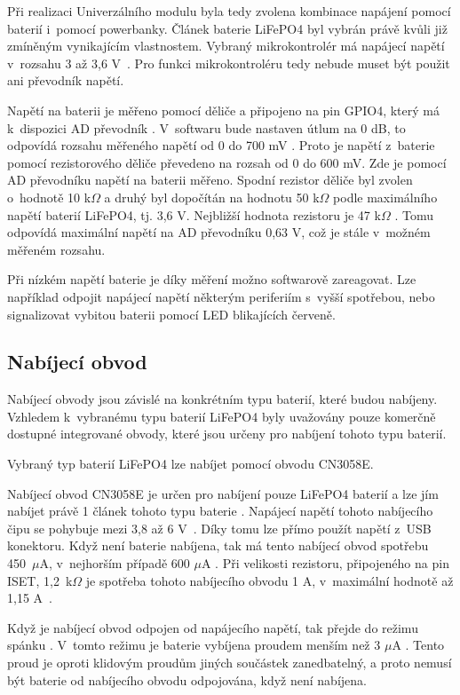 Při realizaci Univerzálního modulu byla tedy zvolena kombinace napájení pomocí baterií i~pomocí powerbanky. Článek baterie LiFePO4 byl vybrán právě kvůli již zmíněným 
vynikajícím vlastnostem. Vybraný mikrokontrolér má napájecí napětí v~rozsahu 3 až 3,6 V~\cite{ESP_C3_dtsh}. Pro funkci mikrokontroléru tedy nebude muset být použit ani 
převodník napětí. 

Napětí na baterii je měřeno pomocí děliče a připojeno na pin GPIO4, který má k~dispozici AD převodník \cite{ESP_C3_dtsh}. V~softwaru bude nastaven útlum na 0 dB, to 
odpovídá rozsahu měřeného napětí od 0 do 700 mV \cite{ESP_C3_tech_ref}.
Proto je napětí z~baterie pomocí rezistorového děliče převedeno na rozsah od 0 do 600 mV. Zde je pomocí AD převodníku napětí na baterii měřeno. Spodní rezistor děliče byl
zvolen o~hodnotě 10 k$\Omega$ a druhý byl dopočítán na hodnotu 50 k$\Omega$ podle maximálního napětí baterií LiFePO4, tj. 3,6 V. Nejbližší hodnota rezistoru je 47 k$\Omega$
\cite{rezistorova_rada}. Tomu odpovídá maximální napětí na AD převodníku 0,63 V, což je stále v~možném měřeném rozsahu. 

Při nízkém napětí baterie je díky měření možno softwarově zareagovat. Lze například odpojit napájecí napětí některým periferiím s~vyšší spotřebou, nebo signalizovat vybitou 
baterii pomocí LED blikajících červeně. 

\subsection{Nabíjecí obvod}
Nabíjecí obvody jsou závislé na konkrétním typu baterií, které budou nabíjeny. Vzhledem k~vybranému typu baterií LiFePO4 byly uvažovány pouze komerčně
dostupné integrované obvody, které jsou určeny pro nabíjení tohoto typu baterií. 

Vybraný typ baterií LiFePO4 lze nabíjet pomocí obvodu CN3058E. 

Nabíjecí obvod CN3058E je určen pro nabíjení pouze LiFePO4 baterií a lze jím nabíjet právě 1 článek tohoto typu baterie \cite{charger_dtsh}. Napájecí napětí tohoto 
nabíjecího čipu se pohybuje mezi 3,8 až 6 V~\cite{charger_dtsh}. Díky tomu lze přímo použít napětí z~USB konektoru. Když není baterie nabíjena, tak má tento nabíjecí obvod 
spotřebu 450~$\mu$A, v~nejhorším případě 600 $\mu$A \cite{charger_dtsh}. Při velikosti rezistoru, připojeného na pin ISET, 1,2~k$\Omega$ je spotřeba tohoto nabíjecího obvodu 
1 A, v~maximální hodnotě až 1,15 A~\cite{charger_dtsh}.

Když je nabíjecí obvod odpojen od napájecího napětí, tak přejde do režimu spánku \cite{charger_dtsh}. V~tomto režimu je baterie vybíjena proudem menším než 
3 $\mu$A \cite{charger_dtsh}. Tento proud je oproti klidovým proudům jiných součástek zanedbatelný, a proto nemusí být baterie od nabíjecího obvodu odpojována,
když není nabíjena. 

